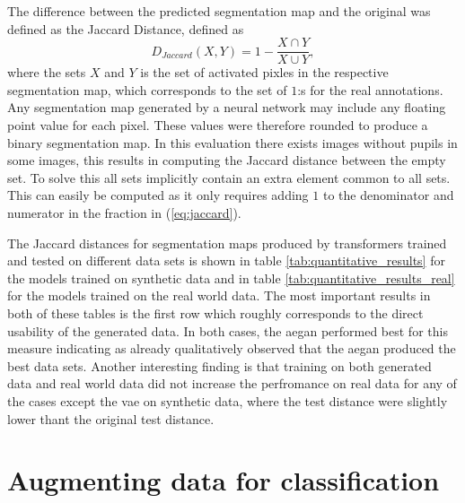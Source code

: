 The difference between the predicted segmentation map and the original was defined as the Jaccard Distance, defined as
\begin{equation}
    D_{Jaccard}(X, Y) = 1 - \frac{X \cap Y}{X \cup Y},
    \label{eq:jaccard}
\end{equation}
where the sets $X$ and $Y$ is the set of activated pixles in the respective segmentation map, which corresponds to the set of $1$:s for the real annotations. Any segmentation map generated by a neural network may include any floating point value for each pixel. These values were therefore rounded to produce a binary segmentation map. In this evaluation there exists images without pupils in some images, this results in computing the Jaccard distance between the empty set. To solve this all sets implicitly contain an extra element common to all sets. This can easily be computed as it only requires adding $1$ to the denominator and numerator in the fraction in (\ref{eq:jaccard}).

The Jaccard distances for segmentation maps produced by transformers trained and tested on different data sets is shown in table \ref{tab:quantitative_results} for the models trained on synthetic data and in table \ref{tab:quantitative_results_real} for the models trained on the real world data. The most important results in both of these tables is the first row which roughly corresponds to the direct usability of the generated data. In both cases, the \acrshort{aegan} performed best for this measure indicating as already qualitatively observed that the \acrshort{aegan} produced the best data sets. Another interesting finding is that training on both generated data and real world data did not increase the perfromance on real data for any of the cases except the \acrshort{vae} on synthetic data, where the test distance were slightly lower thant the original test distance.


\section{Augmenting data for classification}

